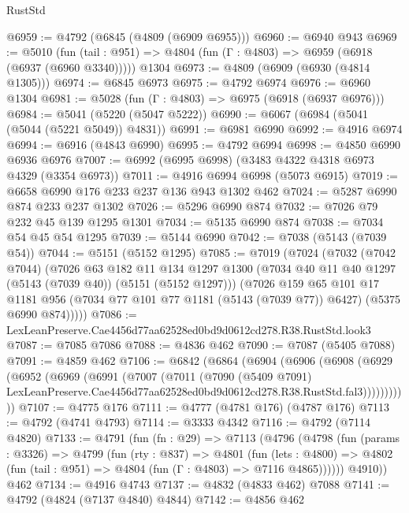 \begin{lexlean}{RustStd}
\begin{coremodule}
@6959 := @4792 (@6845 (@4809 (@6909 @6955)))
@6960 := @6940 @943
@6969 := @5010
    (fun (tail : @951) => @4804 (fun (Γ : @4803) => @6959 (@6918 (@6937 (@6960 @3340)))))
    @1304
@6973 := @4809 (@6909 (@6930 (@4814 @1305)))
@6974 := @6845 @6973
@6975 := @4792 @6974
@6976 := @6960 @1304
@6981 := @5028 (fun (Γ : @4803) => @6975 (@6918 (@6937 @6976)))
@6984 := @5041 (@5220 (@5047 @5222))
@6990 := @6067 (@6984 (@5041 (@5044 (@5221 @5049)) @4831))
@6991 := @6981 @6990
@6992 := @4916 @6974
@6994 := @6916 (@4843 @6990)
@6995 := @4792 @6994
@6998 := @4850 @6990 @6936 @6976
@7007 := @6992 (@6995 @6998) (@3483 @4322 @4318 @6973 @4329 (@3354 @6973))
@7011 := @4916 @6994 @6998 (@5073 @6915)
@7019 := @6658 @6990 @176 @233 @237 @136 @943 @1302 @462
@7024 := @5287 @6990 @874 @233 @237 @1302
@7026 := @5296 @6990 @874
@7032 := @7026 @79 @232 @45 @139 @1295 @1301
@7034 := @5135 @6990 @874
@7038 := @7034 @54 @45 @54 @1295
@7039 := @5144 @6990
@7042 := @7038 (@5143 (@7039 @54))
@7044 := @5151 (@5152 @1295)
@7085 := @7019
    (@7024
      (@7032
        (@7042 @7044)
        (@7026
          @63
          @182
          @11
          @134
          @1297
          @1300
          (@7034 @40 @11 @40 @1297 (@5143 (@7039 @40)) (@5151 (@5152 @1297)))
          (@7026
            @159
            @65
            @101
            @17
            @1181
            @956
            (@7034 @77 @101 @77 @1181 (@5143 (@7039 @77)) @6427)
            (@5375 @6990 @874)))))
@7086 := LexLeanPreserve.Cae4456d77aa62528ed0bd9d0612cd278.R38.RustStd.look3
@7087 := @7085 @7086
@7088 := @4836 @462
@7090 := @7087 (@5405 @7088)
@7091 := @4859 @462
@7106 := @6842
    (@6864
      (@6904
        (@6906
          (@6908
            (@6929
              (@6952
                (@6969
                  (@6991
                    (@7007
                      (@7011
                        (@7090
                          (@5409 @7091)
                          LexLeanPreserve.Cae4456d77aa62528ed0bd9d0612cd278.R38.RustStd.fal3)))))))))))
@7107 := @4775 @176
@7111 := @4777 (@4781 @176) (@4787 @176)
@7113 := @4792 (@4741 @4793)
@7114 := @3333 @4342
@7116 := @4792 (@7114 @4820)
@7133 := @4791
    (fun (fn : @29) =>
    @7113
      (@4796
        (@4798
          (fun (params : @3326) =>
          @4799
            (fun (rty : @837) =>
            @4801
              (fun (lets : @4800) =>
              @4802 (fun (tail : @951) => @4804 (fun (Γ : @4803) => @7116 @4865))))))
        @4910))
    @462
@7134 := @4916 @4743
@7137 := @4832 (@4833 @462) @7088
@7141 := @4792 (@4824 (@7137 @4840) @4844)
@7142 := @4856 @462

\end{coremodule}
\end{lexlean}
